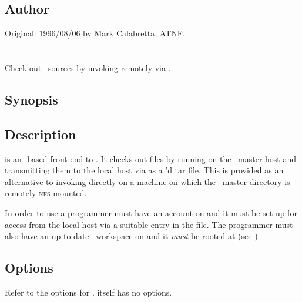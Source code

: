 \subsection*{Author}
 
Original: 1996/08/06 by Mark Calabretta, ATNF.

 
\newpage
\section{}
\label{rao}
 
Check out \aipspp\ sources by invoking  remotely via .

\subsection*{Synopsis}
 
\begin{synopsis}
\end{synopsis}
 
\subsection*{Description}
 
 is an -based front-end to .  It checks out
files by running  on the \aipspp\ master host and transmitting
them to the local host via  as a 'd tar file.  This
is provided as an alternative to invoking  directly on a machine
on which the \aipspp\ master directory is remotely \textsc{nfs} mounted.
 
In order to use  a programmer must have an account on
 and it must be set up for  access from the
local host via a suitable entry in the  file.  The programmer
must also have an up-to-date \aipspp\ workspace on  and
it \emph{must} be  rooted at  (see ).
 
\subsection*{Options}
 
Refer to the options for .   itself has no options.
 
